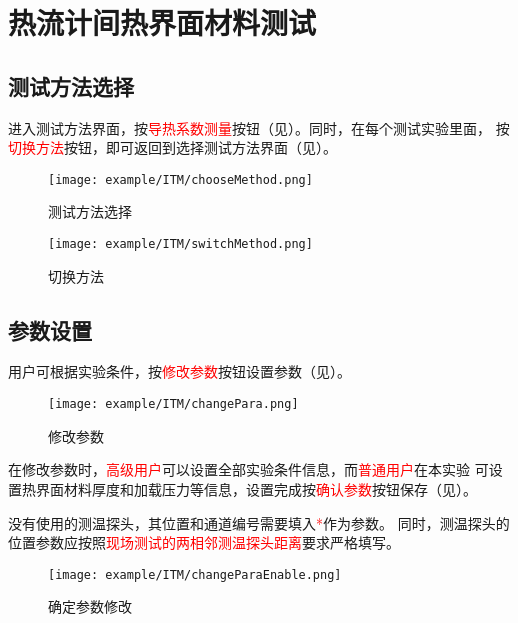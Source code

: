 \section{热流计间热界面材料测试}
\subsection{测试方法选择}
进入测试方法界面，按\textcolor{red}{导热系数测量}按钮（见）。同时，在每个测试实验里面，
按\textcolor{red}{切换方法}按钮，即可返回到选择测试方法界面（见）。
\begin{figure}[htbp]
	\centering
	\texttt{[image: example/ITM/chooseMethod.png]}
	\caption{ 测试方法选择 \label{fig:exmp_itm_chooseMethod}}
\end{figure}

\begin{figure}[htbp]
	\centering
	\texttt{[image: example/ITM/switchMethod.png]}
	\caption{ 切换方法 \label{fig:exmp_itm_switchMethod}}
\end{figure}

\subsection{参数设置}
用户可根据实验条件，按\textcolor{red}{修改参数}按钮设置参数（见）。
\begin{figure}[htbp]
	\centering
	\texttt{[image: example/ITM/changePara.png]}
	\caption{ 修改参数 \label{fig:exmp_itm_changePara}}
\end{figure}
在修改参数时，\textcolor{red}{高级用户}可以设置全部实验条件信息，而\textcolor{red}{普通用户}在本实验
可设置热界面材料厚度和加载压力等信息，设置完成按\textcolor{red}{确认参数}按钮保存（见）。
\begin{note}
没有使用的测温探头，其位置和通道编号需要填入\textcolor{red}{*}作为参数。
同时，测温探头的位置参数应按照\textcolor{red}{现场测试的两相邻测温探头距离}要求严格填写。
\end{note}
\begin{figure}[htbp]
	\centering
	\texttt{[image: example/ITM/changeParaEnable.png]}
	\caption{ 确定参数修改 \label{fig:exmp_itm_changeParaEnable}}
\end{figure}
~\\
